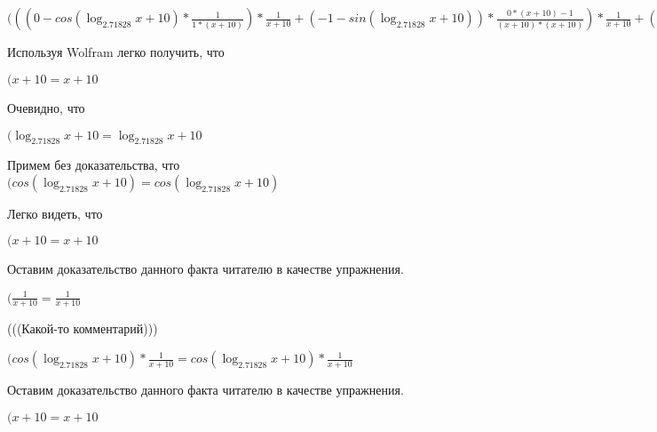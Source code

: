 \documentclass[12pt,a4paper,fleqn]{article}
\theoremstyle{definition}
\begin{document}
$((( 0  - cos(\log_{ 2.71828 }{ x  +  10 }) * \frac{ 1 }{ 1  * ( x  +  10 )}
) * \frac{ 1 }{ x  +  10 }
 + ( -1  - sin(\log_{ 2.71828 }{ x  +  10 })) * \frac{ 0  * ( x  +  10 ) -  1 }{( x  +  10 ) * ( x  +  10 )}
) * \frac{ 1 }{ x  +  10 }
 + ( -1  - sin(\log_{ 2.71828 }{ x  +  10 })) * \frac{ 1 }{ x  +  10 }
 * \frac{ 0  * ( x  +  10 ) -  1 }{( x  +  10 ) * ( x  +  10 )}
 + ( -1  - sin(\log_{ 2.71828 }{ x  +  10 })) * \frac{ 1 }{ 1  * ( x  +  10 )}
 * \frac{ -2 }{( x  +  10 ) * ( x  +  10 )}
 + cos(\log_{ 2.71828 }{ x  +  10 }) * \frac{ 0  * ( x  +  10 ) * ( x  +  10 ) -  -2  * ( 1  * ( x  +  10 ) + ( x  +  10 ) *  1 )}{( x  +  10 ) * ( x  +  10 ) * ( x  +  10 ) * ( x  +  10 )}
 = (( 0  - cos(\log_{ 2.71828 }{ x  +  10 }) * \frac{ 1 }{ 1  * ( x  +  10 )}
) * \frac{ 1 }{ x  +  10 }
 + ( -1  - sin(\log_{ 2.71828 }{ x  +  10 })) * \frac{ 0  * ( x  +  10 ) -  1 }{( x  +  10 ) * ( x  +  10 )}
) * \frac{ 1 }{ x  +  10 }
 + ( -1  - sin(\log_{ 2.71828 }{ x  +  10 })) * \frac{ 1 }{ x  +  10 }
 * \frac{ 0  * ( x  +  10 ) -  1 }{( x  +  10 ) * ( x  +  10 )}
 + ( -1  - sin(\log_{ 2.71828 }{ x  +  10 })) * \frac{ 1 }{ 1  * ( x  +  10 )}
 * \frac{ -2 }{( x  +  10 ) * ( x  +  10 )}
 + cos(\log_{ 2.71828 }{ x  +  10 }) * \frac{ 0  * ( x  +  10 ) * ( x  +  10 ) -  -2  * ( 1  * ( x  +  10 ) + ( x  +  10 ) *  1 )}{( x  +  10 ) * ( x  +  10 ) * ( x  +  10 ) * ( x  +  10 )}
$

Используя Wolfram легко получить, что

$( x  +  10  =  x  +  10 $

Очевидно, что

$(\log_{ 2.71828 }{ x  +  10 } = \log_{ 2.71828 }{ x  +  10 }$

Примем без доказательства, что
$(cos(\log_{ 2.71828 }{ x  +  10 }) = cos(\log_{ 2.71828 }{ x  +  10 })$

Легко видеть, что

$( x  +  10  =  x  +  10 $

Оставим доказательство данного факта читателю в качестве упражнения.

$(\frac{ 1 }{ x  +  10 }
 = \frac{ 1 }{ x  +  10 }
$

(((Какой-то комментарий)))

$(cos(\log_{ 2.71828 }{ x  +  10 }) * \frac{ 1 }{ x  +  10 }
 = cos(\log_{ 2.71828 }{ x  +  10 }) * \frac{ 1 }{ x  +  10 }
$

Оставим доказательство данного факта читателю в качестве упражнения.

$( x  +  10  =  x  +  10 $
\end{document}

